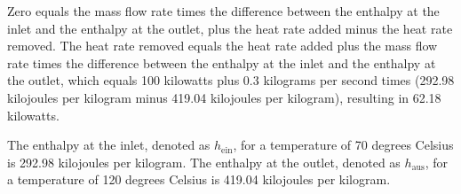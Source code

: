 Zero equals the mass flow rate times the difference between the enthalpy at the inlet and the enthalpy at the outlet, plus the heat rate added minus the heat rate removed. The heat rate removed equals the heat rate added plus the mass flow rate times the difference between the enthalpy at the inlet and the enthalpy at the outlet, which equals 100 kilowatts plus 0.3 kilograms per second times (292.98 kilojoules per kilogram minus 419.04 kilojoules per kilogram), resulting in 62.18 kilowatts.

The enthalpy at the inlet, denoted as \( h_{\text{ein}} \), for a temperature of 70 degrees Celsius is 292.98 kilojoules per kilogram. The enthalpy at the outlet, denoted as \( h_{\text{aus}} \), for a temperature of 120 degrees Celsius is 419.04 kilojoules per kilogram.